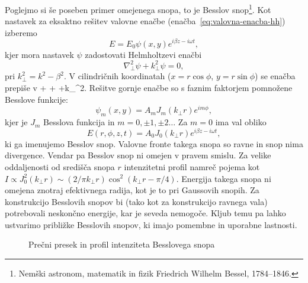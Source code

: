 Poglejmo si še poseben primer omejenega snopa, to je Besslov
snop\footnote{Nemški astronom, matematik in fizik Friedrich Wilhelm Bessel, 1784--1846.}. 
Kot nastavek za eksaktno rešitev valovne enačbe (enačba~\ref{eq:valovna-enacba-hh})
izberemo
\begin{equation}
E=E_{0}\psi(x,y)e^{i\beta z-i\omega t},
\end{equation}
kjer mora nastavek $\psi$ zadostovati Helmholtzevi enačbi
\begin{equation}
\nabla_{\perp}^{2}\psi+k_{\perp}^{2}\psi=0,
\end{equation}
pri $k_{\perp}^{2}=k^{2}-\beta^{2}$. V cilindričnih
koordinatah ($x=r\cos\phi$, $y=r\sin\phi$) se enačba prepiše v 
\beq
{}+ 
+ +k_{\perp}^{2}.
\eeq
Rešitve gornje enačbe so s faznim faktorjem pomnožene Besslove funkcije:
\begin{equation}
\psi_m(x,y)=A_{m}J_{m}(k_{\perp}r)e^{im\phi},
\end{equation}
kjer je $J_{m}$ Besslova funkcija in $m=0,\pm1,\pm2 \ldots$ Za
$m=0$ ima val obliko
\begin{equation}
E(r,\phi,z,t)=A_{0}J_{0}(k_{\perp}r)e^{i\beta z-i \omega t},
\label{eq:Besslov-snop}
\end{equation}
ki ga imenujemo Besslov snop. Valovne fronte takega snopa so ravne 
in snop nima divergence. Vendar pa Besslov snop ni omejen v pravem smislu. Za 
velike oddaljenosti od središča snopa $r$ intenzitetni profil namreč pojema kot 
$I \propto J_{0}^{2}(k_{\perp}r)\sim (2/\pi k_{\perp}r)\cos^{2}(k_{\perp}r-\pi/4)$.
Energija takega snopa ni omejena znotraj efektivnega radija,
kot je to pri Gaussovih snopih. Za konstrukcijo Besslovih snopov
bi (tako kot za konstrukcijo ravnega vala) potrebovali neskončno energije,
kar je seveda nemogoče. Kljub temu pa lahko ustvarimo približke Besslovih 
snopov, ki imajo pomembne in uporabne lastnosti. 

\begin{figure}[h]
\centering
\def\svgwidth{80truemm} 

\caption{Prečni presek in profil intenziteta Besslovega snopa}
\label{fig:Besslov_presek}
\end{figure}

